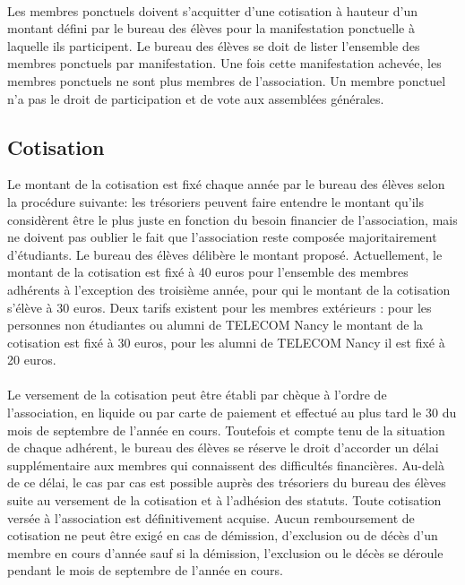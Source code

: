 \documentclass{article} %
\begin{document}
            \paragraph{}
			Les membres ponctuels doivent s’acquitter d’une cotisation à hauteur
			d’un montant défini par le bureau des élèves pour la manifestation
			ponctuelle à laquelle ils participent. Le bureau des élèves se doit
			de lister l’ensemble des membres ponctuels par manifestation. Une
			fois cette manifestation achevée, les membres ponctuels ne sont plus
			membres de l’association. Un membre ponctuel n’a pas le droit de
			participation et de vote aux assemblées générales.

		\subsection{Cotisation}
\label{sub:cotisation}

			Le montant de la cotisation est fixé chaque année par le bureau des
			élèves selon la procédure suivante: les trésoriers peuvent faire
			entendre le montant qu’ils considèrent être le plus juste en
			fonction du besoin financier de l’association, mais ne doivent pas
			oublier le fait que l’association reste composée majoritairement
			d'étudiants. Le bureau des élèves délibère le montant proposé.
			Actuellement, le montant de la cotisation est fixé à 40 euros pour
			l’ensemble des membres adhérents à l’exception des troisième année,
			pour qui le montant de la cotisation s’élève à 30 euros. Deux tarifs
			existent pour les membres extérieurs : pour les personnes non étudiantes
			ou alumni de TELECOM Nancy le montant de la cotisation est fixé à 30
			euros, pour les alumni de TELECOM Nancy il est fixé à 20 euros.

            \paragraph{}
			Le versement de la cotisation peut être établi par chèque à l’ordre
			de l’association, en liquide ou par carte de paiement et effectué
			au plus tard le 30 du mois de septembre de l’année en cours.
			Toutefois et compte tenu de la situation de chaque adhérent, le
			bureau des élèves se réserve le droit d’accorder un délai
			supplémentaire aux membres qui connaissent des difficultés
			financières. Au-delà de ce délai, le cas par cas est possible auprès
			des trésoriers du bureau des élèves suite au versement de la
			cotisation et à l’adhésion des statuts. Toute cotisation versée à
			l’association est définitivement acquise. Aucun remboursement de
			cotisation ne peut être exigé en cas de démission, d’exclusion ou de
			décès d’un membre en cours d’année sauf si la démission, l’exclusion
			ou le décès se déroule pendant le mois de septembre de l’année en
			cours.
\end{document}
